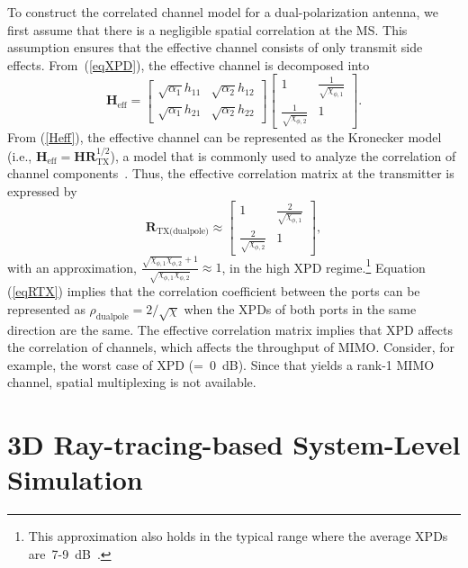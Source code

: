 \documentclass[journal]{IEEEtran}
\begin{document}
To construct the correlated channel model for a dual-polarization antenna, we first assume that there is a negligible spatial correlation at the MS. This assumption ensures that the effective channel consists of only transmit side effects. From~(\ref{eqXPD}), the effective channel is decomposed into
\begin{equation}\label{Heff}
\pmb{H}_\text{eff}=\begin{bmatrix}
\sqrt{\alpha_{1}}h_{11}&\sqrt{\alpha_{2}}h_{12}\\
\sqrt{\alpha_{1}}h_{21}&\sqrt{\alpha_{2}}h_{22}
\end{bmatrix}\begin{bmatrix}
1&\frac{1}{\sqrt{\chi_{\phi,1}}}\\
\frac{1}{\sqrt{\chi_{\phi,2}}}&1
\end{bmatrix}.
\end{equation}
From (\ref{Heff}), the effective channel can be represented as the Kronecker model (i.e., $\pmb{H}_\text{eff}=\pmb{H}\pmb{R}^{1/2}_{\text{TX}}$), a model that is commonly used to analyze the correlation of channel components~\cite{3DDPchannel,3GPP_3DSCM}. Thus, the effective correlation matrix at the transmitter is expressed by
\begin{equation}
\pmb{R}_{\text{TX(dualpole)}}
\approx\begin{bmatrix}
1&\frac{2}{\sqrt{\chi_{\phi,1}}}\\
\frac{2}{\sqrt{\chi_{\phi,2}}}&1
\end{bmatrix},
\label{eqRTX}
\end{equation}
with an approximation, $\frac{\sqrt{\chi_{\phi,1}\chi_{\phi,2}}+1}{\sqrt{\chi_{\phi,1}\chi_{\phi,2}}}\approx 1$, in the high XPD regime.\footnote{This approximation also holds in the typical range where the average XPDs are~{7-9~dB}~\cite{3GPP_3DSCM}.} Equation (\ref{eqRTX}) implies that the correlation coefficient between the ports can be represented as $\rho_{\textrm{dualpole}}=2/\sqrt{\chi}$ when the XPDs of both ports in the same direction are the same. The effective correlation matrix implies that XPD affects the correlation of channels, which affects the throughput of MIMO. Consider, for example, the worst case of XPD (=~0~dB). Since that yields a rank-1 MIMO channel, spatial multiplexing is not available.

\section{3D Ray-tracing-based System-Level Simulation}
\end{document}
